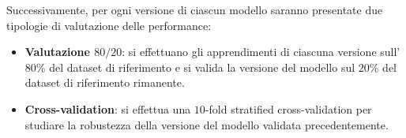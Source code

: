 \begin{table}[!ht]
    \caption{Riassunto delle operazioni effettuate sui dataset e utilizzo dei dataset per i modelli.}
    \label{tab:riassunto_operazioni_dataset}
\end{table}

Successivamente, per ogni versione di ciascun modello saranno presentate due
tipologie di valutazione delle performance:
\begin{itemize}
    \item \textbf{Valutazione $80/20$}: si effettuano gli apprendimenti di
          ciascuna versione sull'$80\%$ del dataset di riferimento e si valida
          la versione del modello sul $20\%$ del dataset di riferimento rimanente.
    \item \textbf{Cross-validation}: si effettua una $10$-fold stratified
          cross-validation per studiare la robustezza della versione del modello
          validata precedentemente.
\end{itemize}



